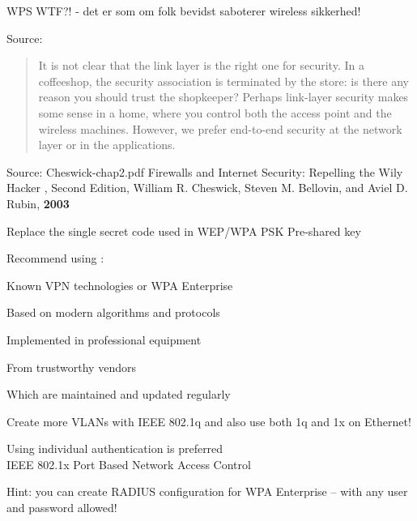 \documentclass[Screen16to9,17pt]{foils}
\begin{document}
\vskip 2cm
\centerline{WPS WTF?! - det er som om folk bevidst saboterer wireless sikkerhed!}
\vskip 2cm

Source: 



\begin{quote}\large
It is not clear that the link layer is the right one for security. In a coffeeshop, the security association is terminated by the store: is there any reason you should trust the shopkeeper? Perhaps link-layer security makes some sense in a home, where you control both the access point and the wireless machines. However, we prefer end-to-end security at the network layer or in the
applications.
\end{quote} Source: Cheswick-chap2.pdf Firewalls and Internet Security: Repelling the Wily Hacker , Second Edition, William R. Cheswick, Steven M. Bellovin, and Aviel D. Rubin, {\bf 2003}




Replace the single secret code used in WEP/WPA PSK Pre-shared key

Recommend using :
\begin{list2}
\item Known VPN technologies or WPA Enterprise
\item Based on modern algorithms and protocols
\item Implemented in professional equipment
\item From trustworthy vendors
\item Which are maintained and updated regularly
\item Create more VLANs with IEEE 802.1q and also use both 1q and 1x on Ethernet!
\item Using individual authentication is preferred\\
IEEE 802.1x Port Based Network Access Control
\item Hint: you can create RADIUS configuration for WPA Enterprise -- with any user and password allowed!\\
\end{list2}


\end{document}
